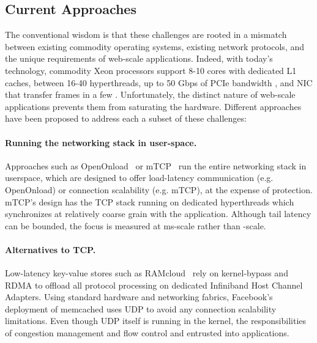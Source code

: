 \subsection{Current Approaches}
\label{sec:motivation:current}


The conventional wisdom is that these challenges are rooted in a
mismatch between existing commodity operating systems, existing
network protocols, and the unique requirements of web-scale
applications.  Indeed, with today's technology, commodity Xeon
processors support 8-10 cores with dedicated L1 caches, between 16-40
hyperthreads, up to 50 Gbps of PCIe bandwidth , and NIC that transfer
frames in a few \microsecond.  Unfortunately, the distinct nature of
web-scale applications prevents them from saturating the hardware.
Different approaches have been proposed to address each a subset of
these challenges:

\paragraph{Running the networking stack in user-space.}  

Approaches such as OpenOnload~\cite{openonload} or
mTCP~\cite{jeong2014mtcp} run the entire networking stack in
userspace, which are designed to offer load-latency communication
(e.g. OpenOnload) or connection scalability (e.g. mTCP), at the
expense of protection.  mTCP's design has the TCP stack running on
dedicated hyperthreads which synchronizes at relatively coarse grain
with the application. Although tail latency can be bounded, the focus
is measured at ms-scale rather than \microsecond-scale.

\paragraph{Alternatives to TCP.}

Low-latency key-value stores such as
RAMcloud~\cite{DBLP:conf/sosp/OngaroRSOR11} rely on kernel-bypass and
RDMA to offload all protocol processing on dedicated Infiniband Host Channel
Adapters.  Using standard hardware and networking fabrics, Facebook's
deployment of memcached uses UDP to avoid any connection scalability
limitations.  Even though UDP itself is running in the kernel, the
responsibilities of congestion management and flow control and
entrusted into applications.

